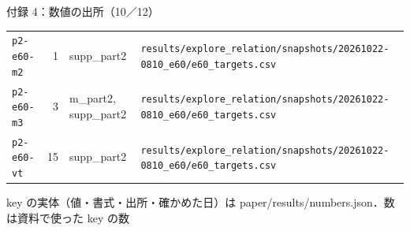 \begin{frame}{付録 4：数値の出所（10／12）}
\begin{tabularx}{\textwidth}{@{}l r l X@{}}
    \texttt{p2-e60-m2} & 1 & supp\_part2 & \texttt{results/\allowbreak{}explore\_\allowbreak{}relation/\allowbreak{}snapshots/\allowbreak{}20261022-0810\_\allowbreak{}e60/\allowbreak{}e60\_\allowbreak{}targets.csv} \\
    \texttt{p2-e60-m3} & 3 & m\_part2, supp\_part2 & \texttt{results/\allowbreak{}explore\_\allowbreak{}relation/\allowbreak{}snapshots/\allowbreak{}20261022-0810\_\allowbreak{}e60/\allowbreak{}e60\_\allowbreak{}targets.csv} \\
    \texttt{p2-e60-vt} & 15 & supp\_part2 & \texttt{results/\allowbreak{}explore\_\allowbreak{}relation/\allowbreak{}snapshots/\allowbreak{}20261022-0810\_\allowbreak{}e60/\allowbreak{}e60\_\allowbreak{}targets.csv} \\
    \bottomrule
  \end{tabularx}\par
  {\raggedright\tiny key の実体（値・書式・出所・確かめた日）は paper/results/numbers.json．数は資料で使った key の数\par}
\end{frame}
